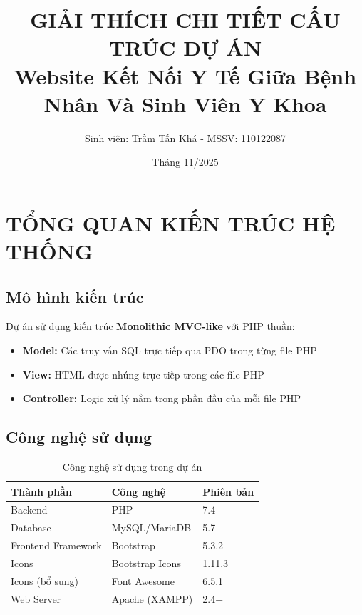 \documentclass[a4paper,12pt]{article}
\title{\textbf{GIẢI THÍCH CHI TIẾT CẤU TRÚC DỰ ÁN}\\[0.5cm]
\large Website Kết Nối Y Tế Giữa Bệnh Nhân Và Sinh Viên Y Khoa}
\author{Sinh viên: Trầm Tấn Khá - MSSV: 110122087}
\date{Tháng 11/2025}
\begin{document}
\maketitle
\tableofcontents
\newpage

\section{TỔNG QUAN KIẾN TRÚC HỆ THỐNG}

\subsection{Mô hình kiến trúc}

Dự án sử dụng kiến trúc \textbf{Monolithic MVC-like} với PHP thuần:

\begin{itemize}
    \item \textbf{Model:} Các truy vấn SQL trực tiếp qua PDO trong từng file PHP
    \item \textbf{View:} HTML được nhúng trực tiếp trong các file PHP
    \item \textbf{Controller:} Logic xử lý nằm trong phần đầu của mỗi file PHP
\end{itemize}

\subsection{Công nghệ sử dụng}

\begin{table}[h]
\centering
\begin{tabular}{|l|l|l|}
\hline
\textbf{Thành phần} & \textbf{Công nghệ} & \textbf{Phiên bản} \\
\hline
Backend & PHP & 7.4+ \\
Database & MySQL/MariaDB & 5.7+ \\
Frontend Framework & Bootstrap & 5.3.2 \\
Icons & Bootstrap Icons & 1.11.3 \\
Icons (bổ sung) & Font Awesome & 6.5.1 \\
Web Server & Apache (XAMPP) & 2.4+ \\
\hline
\end{tabular}
\caption{Công nghệ sử dụng trong dự án}
\end{table}

\end{document}
